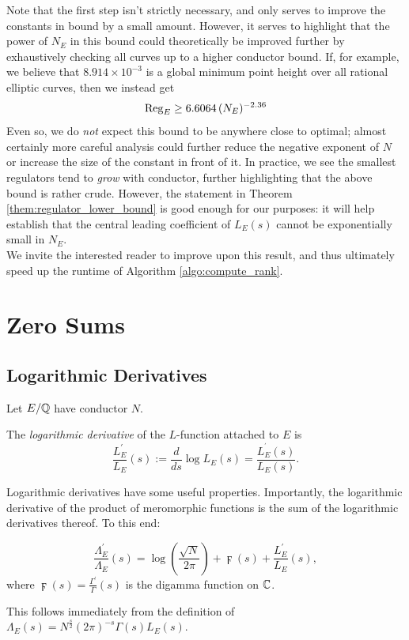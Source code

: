 \documentclass[10pt]{article}
\newcommand{\pr}{^{\prime}}
\newcommand{\Les}{L_E(s)}
\newcommand{\Lams}{\Lambda_E(s)}
\newcommand{\ldLes}{\frac{L_E\pr}{L_E}(s)}
\newcommand{\ldLe}[1]{\frac{L_E\pr}{L_E}\left(#1\right)}
\newcommand{\ldLam}[1]{\frac{\Lambda_E\pr}{\Lambda_E}\left(#1\right)}
\begin{document}
Note that the first step isn't strictly necessary, and only serves to improve the constants in bound by a small amount. However, it serves to highlight that the power of $N_E$ in this bound could theoretically be improved further by exhaustively checking all curves up to a higher conductor bound. If, for example, we believe that $8.914\times 10^{-3}$ is a global minimum point height over all rational elliptic curves, then we instead get
\begin{equation}
\operatorname{Reg}_E \ge 6.6064 \, (N_E)^{-2.36}
\end{equation}
Even so, we do {\it not} expect this bound to be anywhere close to optimal; almost certainly more careful analysis could further reduce the negative exponent of $N$ or increase the size of the constant in front of it. In practice, we see the smallest regulators tend to {\it grow} with conductor, further highlighting that the above bound is rather crude. However, the statement in Theorem \ref{them:regulator_lower_bound} is good enough for our purposes: it will help establish that the central leading coefficient of $\Les$ cannot be exponentially small in $N_E$. \\

We invite the interested reader to improve upon this result, and thus ultimately speed up the runtime of Algorithm \ref{algo:compute_rank}.


\newpage
\section{Zero Sums}
\subsection{Logarithmic Derivatives}\label{sec:log_derivs}

Let $E/\mathbb{Q}$  have conductor $N$.
\begin{definition}
The {\it logarithmic derivative} of the $L$-function attached to $E$ is
\begin{equation}
\ldLes := \frac{d}{ds} \log \Les = \frac{L_E^{\pr}(s)}{\Les}.
\end{equation}
\end{definition}
Logarithmic derivatives have some useful properties. Importantly, the logarithmic derivative of the product of meromorphic functions is the sum of the logarithmic derivatives thereof. To this end:
\begin{proposition}
\begin{equation}\label{eqn:logderiv_relation}
\ldLam{s} = \log\left(\frac{\sqrt{N}}{2\pi}\right) + \digamma(s) + \ldLe{s},
\end{equation}
where $\digamma(s) = \frac{\Gamma\pr}{\Gamma}(s)$ is the digamma function on $\mathbb{C}$.
\end{proposition}
This follows immediately from the definition of $\Lams = N^{\frac{s}{2}}(2\pi)^{-s}\Gamma(s)\Les$. \\
\end{document}
